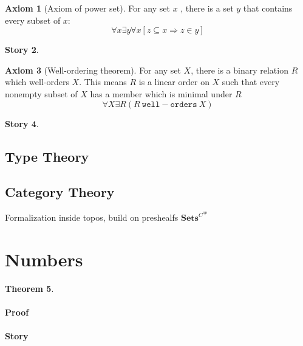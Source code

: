 \documentclass[11pt]{report}
\theoremstyle{plain} %
\newtheorem{thm}{Theorem}[section]
\theoremstyle{definition}
\newtheorem{axiom}[thm]{Axiom}%
\newtheorem{st}[thm]{Story}%
\theoremstyle{remark}
\begin{document}
\begin{axiom}[Axiom of power set]
  For any set \(x\)  , there is a set \(y\) that contains every subset of \(x\):
  \[\forall x \exists y \forall x [ z \subseteq x \Rightarrow z \in y ] \]
\end{axiom}
\begin{st}
  
\end{st}

\begin{axiom}[Well-ordering theorem]
  For any set \(X\), there is  a binary relation \(R\) which well-orders \(X\). This means \(R\) is a linear order on \(X\) such that every nonempty subset of \(X\) has a member which is minimal under \(R\)
  \[\forall X \exists R (R~\mathtt{well-orders}~X)\]
\end{axiom}
\begin{st}
  
\end{st}

\subsection{Type Theory}



\subsection{Category Theory}
Formalization inside topos, build on preshealfs \(\mathbf{Sets}^{C^{op}}\)

\section{Numbers}
\begin{thm}
  
\end{thm}

\paragraph{Proof}
\paragraph{Story}
\end{document}
